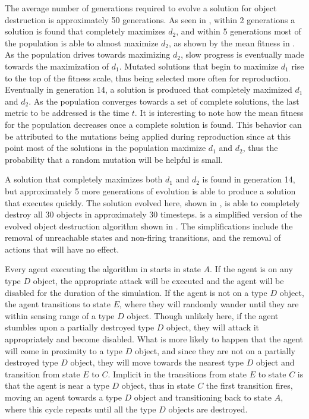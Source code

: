 The average number of generations required to evolve a solution for object destruction is approximately 50 generations. As seen in , within 2 generations a solution is found that completely maximizes $d_2$, and within 5 generations most of the population is able to almost maximize $d_2$, as shown by the mean fitness in .  As the population drives towards maximizing $d_2$, slow progress is eventually made towards the maximization of $d_1$.  Mutated solutions that begin to maximize $d_1$ rise to the top of the fitness scale, thus being selected more often for reproduction.  Eventually in generation 14, a solution is produced that completely maximized $d_1$ and $d_2$.  As the population converges towards a set of complete solutions, the last metric to be addressed is the time $t$.  It is interesting to note how the mean fitness for the population decreases once a complete solution is found.  This behavior can be attributed to the mutations being applied during reproduction since at this point most of the solutions in the population maximize $d_1$ and $d_2$, thus the probability that a random mutation will be helpful is small.

A solution that completely maximizes both $d_1$ and $d_2$ is found in generation 14, but approximately 5 more generations of evolution is able to produce a solution that executes quickly.  The solution evolved here, shown in , is able to completely destroy all 30 objects in approximately 30 timesteps.   is a simplified version of the evolved object destruction algorithm shown in .  The simplifications include the removal of unreachable states and non-firing transitions, and the removal of actions that will have no effect.  

Every agent executing the algorithm in  starts in state $A$.  If the agent is on any type $D$ object, the appropriate attack will be executed and the agent will be disabled for the duration of the simulation.  If the agent is not on a type $D$ object, the agent transitions to state $E$, where they will randomly wander until they are within sensing range of a type $D$ object.  Though unlikely here, if the agent stumbles upon a partially destroyed type $D$ object, they will attack it appropriately and become disabled.  What is more likely to happen that the agent will come in proximity to a type $D$ object, and since they are not on a partially destroyed type $D$ object, they will move towards the nearest type $D$ object and transition from state $E$ to $C$.   Implicit in the transitions from state $E$ to state $C$ is that the agent is near a type $D$ object, thus in state $C$ the first transition fires, moving an agent towards a type $D$ object and transitioning back to state $A$, where this cycle repeats until all the type $D$ objects are destroyed.    

